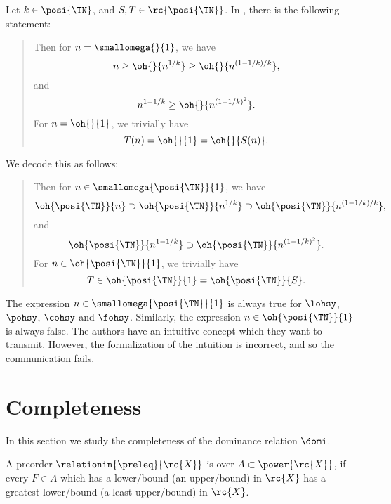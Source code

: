 \documentclass[b5paper, english, oneside]{memoir}
\begin{document}
\begin{example}
Let $k \in \posi{\TN}$, and $S, T \in \rc{\posi{\TN}}$. In \cite[page 9]{ExponentialTrees}, there is the following statement:
\begin{quote}
Then for $n = \smallomega{}{1}$, we have
\begin{equation*}
n \geq \oh{}{n^{1/k}} \geq \oh{}{n^{(1 - 1/k)/k}},
\end{equation*}
and
\begin{equation*}
n^{1-1/k} \geq \oh{}{n^{(1-1/k)^2}}.
\end{equation*}
For $n = \oh{}{1}$, we trivially have
\begin{equation*}
T(n) = \oh{}{1} = \oh{}{S(n)}.	
\end{equation*}
\end{quote}
We decode this as follows:
\begin{quote}
Then for $n \in \smallomega{\posi{\TN}}{1}$, we have
\begin{equation*}
\oh{\posi{\TN}}{n} \supset \oh{\posi{\TN}}{n^{1/k}} \supset \oh{\posi{\TN}}{n^{(1 - 1/k)/k}},
\end{equation*}
and
\begin{equation*}
\oh{\posi{\TN}}{n^{1-1/k}} \supset \oh{\posi{\TN}}{n^{(1-1/k)^2}}.
\end{equation*}
For $n \in \oh{\posi{\TN}}{1}$, we trivially have
\begin{equation*}
T \in \oh{\posi{\TN}}{1} = \oh{\posi{\TN}}{S}.	
\end{equation*}
\end{quote}
The expression $n \in \smallomega{\posi{\TN}}{1}$ is always true for $\lohsy$, $\pohsy$, $\cohsy$ and $\fohsy$. Similarly, the expression $n \in \oh{\posi{\TN}}{1}$ is always false. The authors have an intuitive concept which they want to transmit. However, the formalization of the intuition is incorrect, and so the communication fails. 
\end{example}

\section{Completeness}

In this section we study the completeness of the dominance relation $\domi$.

\begin{definition}
A preorder $\relationin{\preleq}{\rc{X}}$ is  over $A \subset \power{\rc{X}}$, if every $F \in A$ which has a lower\-/bound (an upper\-/bound) in $\rc{X}$ has a greatest lower\-/bound (a least upper\-/bound) in $\rc{X}$. 
\end{definition}
\end{document}
